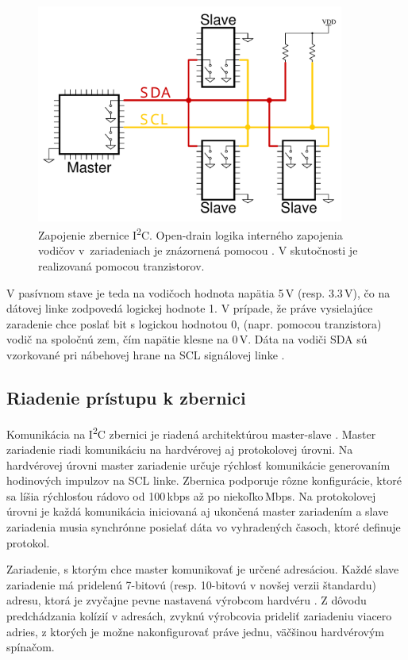 \begin{figure}
    \centerline{\includegraphics[width=0.9\textwidth]{images/busses/i2cWiring.pdf}}
    \caption[Zapojenie zbernice I\textsuperscript{2}C]{Zapojenie zbernice I\textsuperscript{2}C. Open-drain logika interného zapojenia vodičov v~zariadeniach je znázornená pomocou . V skutočnosti je realizovaná pomocou tranzistorov.}
    \label{obr:i2cWiring}
\end{figure}

V pasívnom stave je teda na vodičoch hodnota napätia 5\,V (resp. 3.3\,V), čo na dátovej linke zodpovedá logickej hodnote 1. V prípade, že práve vysielajúce zaradenie chce poslať bit s logickou hodnotou 0,  (napr. pomocou tranzistora) vodič na spoločnú zem, čím napätie klesne na 0\,V. Dáta na vodiči SDA sú vzorkované pri nábehovej hrane na SCL signálovej linke \cite{i2cSpec}.

\subsection{Riadenie prístupu k zbernici}
Komunikácia na I\textsuperscript{2}C zbernici je riadená architektúrou master-slave \cite{i2cSpec}. Master zariadenie riadi komunikáciu na hardvérovej aj protokolovej úrovni. Na hardvérovej úrovni master zariadenie určuje rýchlosť komunikácie generovaním hodinových impulzov na SCL linke. Zbernica podporuje rôzne konfigurácie, ktoré sa líšia rýchlosťou rádovo od 100\,kbps až po niekoľko\,Mbps. Na protokolovej úrovni je každá komunikácia iniciovaná aj ukončená master zariadením a slave zariadenia musia synchrónne posielať dáta vo vyhradených časoch, ktoré definuje protokol.

Zariadenie, s ktorým chce master komunikovať je určené adresáciou. Každé slave zariadenie má pridelenú 7-bitovú (resp. 10-bitovú v novšej verzii štandardu) adresu, ktorá je zvyčajne pevne nastavená výrobcom hardvéru \cite{i2cSpec}. Z dôvodu predchádzania kolízií v adresách, zvyknú výrobcovia prideliť zariadeniu viacero adries, z ktorých je možne nakonfigurovať práve jednu, väčšinou hardvérovým spínačom.

